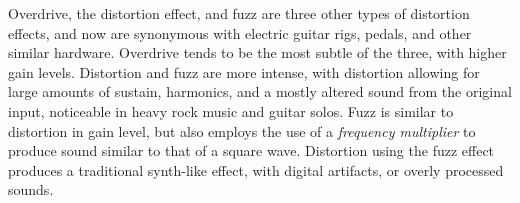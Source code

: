 Overdrive, the distortion effect, and fuzz are three other types of distortion effects, and now are synonymous with electric guitar rigs, pedals, and other similar hardware. Overdrive tends to be the most subtle of the three, with higher gain levels. Distortion and fuzz are more intense, with distortion allowing for large amounts of sustain, harmonics, and a mostly altered sound from the original input, noticeable in heavy rock music and guitar solos. Fuzz is similar to distortion in gain level, but also employs the use of a \textit{frequency multiplier} to produce sound similar to that of a square wave. Distortion using the fuzz effect produces a traditional synth-like effect, with digital artifacts, or overly processed sounds.
